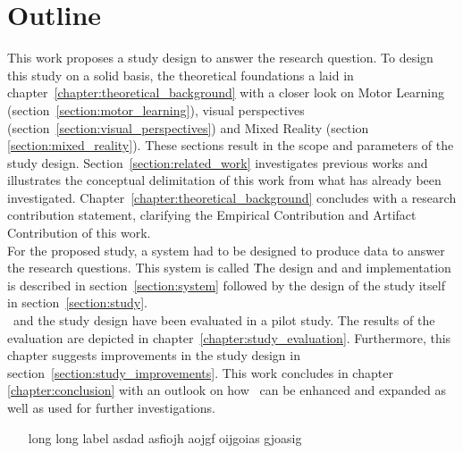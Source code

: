 \section{Outline}
This work proposes a study design to answer the research question. To design this study on a solid basis, the theoretical foundations a laid in chapter~\ref{chapter:theoretical_background} with a closer look on Motor Learning (section~\ref{section:motor_learning}), visual perspectives (section~\ref{section:visual_perspectives}) and Mixed Reality (section \ref{section:mixed_reality}). These sections result in the scope and parameters of the study design. Section~\ref{section:related_work} investigates previous works and illustrates the conceptual delimitation of this work from what has already been investigated. Chapter~\ref{chapter:theoretical_background} concludes with a research contribution statement, clarifying the Empirical Contribution and Artifact Contribution of this work.\\
For the proposed study, a system had to be designed to produce data to answer the research questions. This system is called \exgo\. The design and and implementation is described in section~\ref{section:system} followed by the design of the study itself in section~\ref{section:study}.\\
\exgo\ and the study design have been evaluated in a pilot study. The results of the evaluation are depicted in chapter~\ref{chapter:study_evaluation}. Furthermore, this chapter suggests improvements in the study design in section~\ref{section:study_improvements}. This work concludes in chapter \ref{chapter:conclusion} with an outlook on how \exgo\ can be enhanced and expanded as well as used for further investigations.


\begin{enumerate}[align=left, leftmargin=0pt, labelindent=\parindent,
	listparindent=\parindent, labelwidth=0pt, itemindent=!]
	\item[long long label]  asdad asfiojh aojgf oijgoias gjoasig
\end{enumerate}
